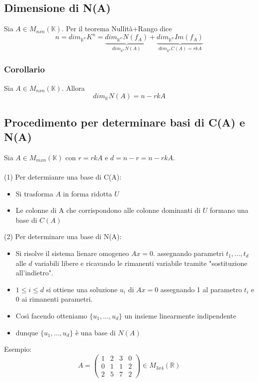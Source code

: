 \documentclass[12pt]{article}
\begin{document}
\subsection{Dimensione di N(A)}

Sia $A \in M_{nxn}(\mathbb{K})$. Per il teorema Nullità+Rango dice
\[n = dim_{\mathbb{K^n}}K^n = \underbrace{dim_{\mathbb{K^n}}N(f_A)}_{dim_{\mathbb{K^n}}N(A)} +  \underbrace{dim_{\mathbb{K^n}}Im(f_A)}_{dim_{\mathbb{K^n}}C(A)= rkA}\]

\subsubsection{Corollario}
Sia $A \in M_{nxn}(\mathbb{K})$. Allora \[dim_{\mathbb{K}}N(A) = n - rkA\]

\subsection{Procedimento per determinare basi di C(A) e N(A)}
Sia $A \in M_{mxn} (\mathbb{K})$ con $r = rkA$ e $d = n - r = n - rkA$.
\\\\
(1) Per determianre una base di C(A):
\begin{itemize}
    \item Si trasforma $A$ in forma ridotta $U$
    \item Le colonne di A che corrispondono alle colonne dominanti di $U$ formano una base di $C(A)$
\end{itemize}
(2) Per determinare una base di N(A):
\begin{itemize}
    \item Si risolve il sistema lienare omogeneo $Ax = 0$. assegnando parametri $t_1, \dots, t_d$ alle $d$ variabili libere e ricavando le rimanenti variabile tramite "sostituzione all'indietro".
    \item $1 \le i \le d$ si ottiene una soluzione $u_i$ di $Ax = 0$ assegnando 1 al parametro $t_i$ e $0$ ai rimanenti parametri.
    \item Così facendo otteniamo $\{u_1, \dots, u_d\}$ un insieme linearmente indipendente
    \item dunque $\{u_1, \dots, u_d\}$ è una base di $N(A)$
\end{itemize}
Esempio:
\[A = \begin{pmatrix}
    1 & 2 & 3 & 0\\
    0 & 1 & 1 & 2\\
    2 & 5 & 7 & 2
\end{pmatrix} \in M_{3x4}(\mathbb{R})\]
\end{document}
